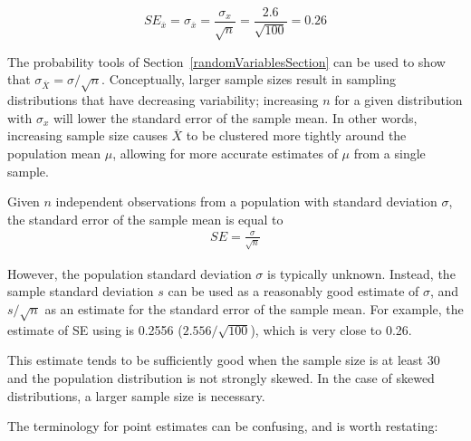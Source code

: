 \begin{spacing}{1.5}
\[SE_{\overline{x}} = \sigma_{\overline{x}} = \dfrac{\sigma_{x}}{\sqrt{n}} = \dfrac{2.6}{\sqrt{100}} = 0.26\]

The probability tools of Section~\ref{randomVariablesSection} can be used to show that $\sigma_{\overline{X}} = \sigma/\sqrt{n}$. Conceptually, larger sample sizes result in sampling distributions that have decreasing variability; increasing $n$ for a given distribution with $\sigma_{x}$ will lower the standard error of the sample mean. In other words, increasing sample size causes $\overline{X}$ to be clustered more tightly around the population mean $\mu$, allowing for more accurate estimates of $\mu$ from a single sample.




\begin{termBox}{
Given $n$ independent observations from a population with standard deviation $\sigma$, the standard error of the sample mean is equal to \vspace{-1mm}
\begin{align*}
SE = \frac{\sigma}{\sqrt{n}}
\label{seOfXBar}
\end{align*}\vspace{-3mm}%
}
\end{termBox}

However, the population standard deviation $\sigma$ is typically unknown. Instead, the sample standard deviation $s$ can be used as a reasonably good estimate of $\sigma$, and $s / \sqrt{n}$ as an estimate for the standard error of the sample mean. For example, the estimate of SE using  is 0.2556 ($2.556 / \sqrt{100}$), which is very close to 0.26.

This estimate tends to be sufficiently good when the sample size is at least 30 and the population distribution is not strongly skewed. In the case of skewed distributions, a larger sample size is necessary.

The terminology for point estimates can be confusing, and is worth restating:  


\end{spacing}
